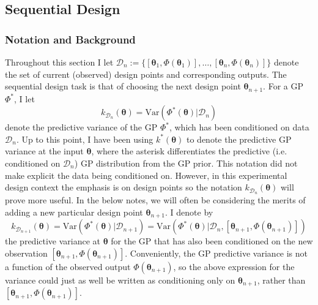 \documentclass[12pt]{article}
\newcommand{\Var}{\mathrm{Var}}
\newcommand{\btheta}{\boldsymbol{\theta}}
\begin{document}
\subsection{Sequential Design}

\subsubsection{Notation and Background}
Throughout this section I let $\mathcal{D}_n := \{[\btheta_1, \Phi(\btheta_1)], \dots, [\btheta_n, \Phi(\btheta_n)]\}$ denote the set of current (observed) design points and corresponding outputs. 
The sequential design task is that of choosing the 
next design point $\btheta_{n+1}$. For a GP $\Phi^*$, I let
\[k_{\mathcal{D}_{n}}(\btheta) = \Var(\Phi^*(\btheta)|\mathcal{D}_{n})\]
denote the predictive variance of the GP $\Phi^*$, which has been conditioned on data $\mathcal{D}_n$. Up to this point, I have been using $k^*(\btheta)$ to denote the predictive GP variance 
at the input $\btheta$, where the asterisk differentiates the predictive (i.e. conditioned on $\mathcal{D}_n$) GP distribution from the GP prior. This notation did not make explicit the data being 
conditioned on. However, in this experimental design context the emphasis is on design points so the notation $k_{\mathcal{D}_{n}}(\btheta)$ will prove more useful. 
In the below notes, we will often be considering the merits of adding a new particular design point $\btheta_{n + 1}$. I denote by 
\[k_{\mathcal{D}_{n+1}}(\btheta) = \Var(\Phi^*(\btheta)|\mathcal{D}_{n+1}) = \Var(\Phi^*(\btheta)|\mathcal{D}_{n}, [\btheta_{n+1}, \Phi(\btheta_{n+1})])\]
the predictive variance at $\btheta$ for the GP that has also been conditioned on the new observation $[\btheta_{n+1}, \Phi(\btheta_{n+1})]$. Conveniently, the GP predictive 
variance is not a function of the observed output $\Phi(\btheta_{n+1})$, so the above expression for the variance could just as well be written as conditioning only on 
$\btheta_{n+1}$, rather than $[\btheta_{n+1}, \Phi(\btheta_{n+1})]$. 
\end{document}
